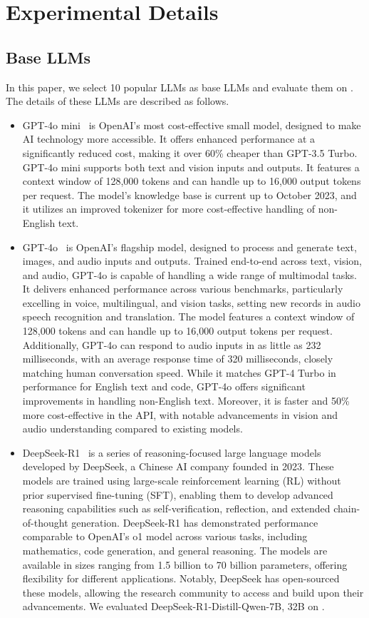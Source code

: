 \section{Experimental Details}
\subsection{Base LLMs}
\label{sec:base_llms}
In this paper, we select 10 popular LLMs as base LLMs and evaluate them on \mytitle.
The details of these LLMs are described as follows.


\begin{itemize}[leftmargin=*]
    \item GPT-4o mini~\cite{gpt4o_mini} is OpenAI's most cost-effective small model, designed to make AI technology more accessible. 
    It offers enhanced performance at a significantly reduced cost, making it over 60\% cheaper than GPT-3.5 Turbo. 
    GPT-4o mini supports both text and vision inputs and outputs. It features a context window of 128,000 tokens and can handle up to 16,000 output tokens per request. The model's knowledge base is current up to October 2023, and it utilizes an improved tokenizer for more cost-effective handling of non-English text.
    
    \item GPT-4o~\cite{openai_access_gpt4} is OpenAI's flagship model, designed to process and generate text, images, and audio inputs and outputs. Trained end-to-end across text, vision, and audio, GPT-4o is capable of handling a wide range of multimodal tasks. It delivers enhanced performance across various benchmarks, particularly excelling in voice, multilingual, and vision tasks, setting new records in audio speech recognition and translation. The model features a context window of 128,000 tokens and can handle up to 16,000 output tokens per request. Additionally, GPT-4o can respond to audio inputs in as little as 232 milliseconds, with an average response time of 320 milliseconds, closely matching human conversation speed. While it matches GPT-4 Turbo in performance for English text and code, GPT-4o offers significant improvements in handling non-English text. Moreover, it is faster and 50\% more cost-effective in the API, with notable advancements in vision and audio understanding compared to existing models.

    \item DeepSeek-R1~\cite{deepseekr1} is a series of reasoning-focused large language models developed by DeepSeek, a Chinese AI company founded in 2023. These models are trained using large-scale reinforcement learning (RL) without prior supervised fine-tuning (SFT), enabling them to develop advanced reasoning capabilities such as self-verification, reflection, and extended chain-of-thought generation. DeepSeek-R1 has demonstrated performance comparable to OpenAI's o1 model across various tasks, including mathematics, code generation, and general reasoning. The models are available in sizes ranging from 1.5 billion to 70 billion parameters, offering flexibility for different applications. Notably, DeepSeek has open-sourced these models, allowing the research community to access and build upon their advancements. We evaluated DeepSeek-R1-Distill-Qwen-{7B, 32B} on \mytitle.


\end{itemize}
